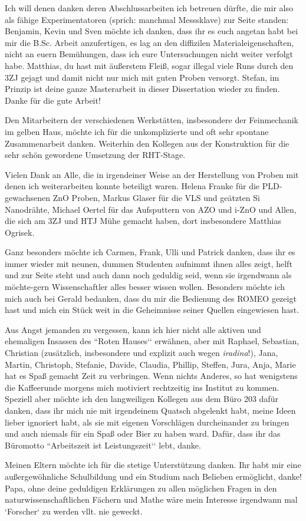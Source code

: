 \begin{appendices}
Ich will denen danken deren Abschlussarbeiten ich betreuen dürfte, die mir also als fähige Experimentatoren (sprich: manchmal Messsklave) zur Seite standen: Benjamin, Kevin und Sven möchte ich danken, dass ihr es euch angetan habt bei mir die B.Sc. Arbeit anzufertigen, es lag an den diffizilen Materialeigenschaften, nicht an euern Bemühungen, dass ich eure Untersuchungen nicht weiter verfolgt habe. Matthias, du hast mit äußerstem Fleiß, sogar illegal viele Runs durch den 3ZJ gejagt und damit nicht nur mich mit guten Proben versorgt. Stefan, im Prinzip ist deine ganze Masterarbeit in dieser Dissertation wieder zu finden. Danke für die gute Arbeit!

Den Mitarbeitern der verschiedenen Werkstätten, insbesondere der Feinmechanik im gelben Haus, möchte ich für die unkomplizierte und oft sehr spontane Zusammenarbeit danken. Weiterhin den Kollegen aus der Konstruktion für die sehr schön gewordene Umsetzung der RHT-Stage.

Vielen Dank an Alle, die in irgendeiner Weise an der Herstellung von Proben mit denen ich weiterarbeiten konnte beteiligt waren. Helena Franke für die PLD-gewachsenen ZnO Proben, Markus Glaser für die VLS und geätzten Si Nanodrähte, Michael Oertel für das Aufsputtern von AZO und i-ZnO und Allen, die sich am 3ZJ und HTJ Mühe gemacht haben, dort insbesondere Matthias Ogrisek.

Ganz besonders möchte ich Carmen, Frank, Ulli und Patrick danken, dass ihr es immer wieder mit neunen, dummen Studenten aufnimmt ihnen alles zeigt, helft und zur Seite steht und auch dann noch geduldig seid, wenn sie irgendwann als möchte-gern Wissenschaftler alles besser wissen wollen. Besonders möchte ich mich auch bei Gerald bedanken, dass du mir die Bedienung des ROMEO gezeigt hast und mich ein Stück weit in die Geheimnisse seiner Quellen eingewiesen hast.

Aus Angst jemanden zu vergessen, kann ich hier nicht alle aktiven und ehemaligen Insassen des ``Roten Hauses‘‘ erwähnen, aber mit Raphael, Sebastian, Christian (zusätzlich, insbesondere und explizit auch wegen \emph{iradina}!), Jana, Martin, Christoph, Stefanie, Davide, Claudia, Phillip, Steffen, Jura, Anja, Marie hat es Spaß gemacht Zeit zu verbringen. Wenn nichts Anderes, so hat wenigstens die Kaffeerunde morgens mich motiviert rechtzeitig ins Institut zu kommen. Speziell aber möchte ich den langweiligen Kollegen aus dem Büro 203 dafür danken, dass ihr mich nie mit irgendeinem Quatsch abgelenkt habt, meine Ideen lieber ignoriert habt, als sie mit eigenen Vorschlägen durcheinander zu bringen und auch niemals für ein Spaß oder Bier zu haben ward. Dafür, dass ihr das Büromotto ``Arbeitszeit ist Leistungszeit‘‘ lebt, danke.

Meinen Eltern möchte ich für die stetige Unterstützung danken. Ihr habt mir eine außergewöhnliche Schulbildung und ein Studium nach Belieben ermöglicht, danke! Papa, ohne deine geduldigen Erklärungen zu allen möglichen Fragen in den naturwissenschaftlichen Fächern und Mathe wäre mein Interesse irgendwann mal `Forscher‘ zu werden vllt. nie geweckt.
 

\end{appendices}
